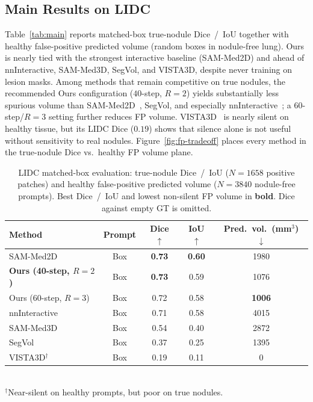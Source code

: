 \documentclass[letterpaper]{article} %
\begin{document}
\subsection{Main Results on LIDC}
\label{sec:exp:lidc}
Table~\ref{tab:main} reports matched-box true-nodule Dice~/~IoU together with healthy false-positive predicted volume (random boxes in nodule-free lung).
Ours is nearly tied with the strongest interactive baseline
(SAM-Med2D) and ahead of nnInteractive, SAM-Med3D, SegVol, and VISTA3D, despite
never training on lesion masks.
Among methods that remain competitive on true nodules, the recommended
Ours configuration (\(40\)-step, \(R{=}2\)) yields substantially less
spurious volume than SAM-Med2D~\citep{sam_med2d2023}, SegVol, and especially
nnInteractive~\citep{nninteractive2025}; a \(60\)-step/\(R{=}3\) setting
further reduces FP volume.
VISTA3D~\citep{vista3d2024} is nearly silent on healthy tissue, but its
LIDC Dice (\(0.19\)) shows that silence alone is not useful without
sensitivity to real nodules.
Figure~\ref{fig:fp-tradeoff} places every method in the true-nodule Dice
vs.\ healthy FP volume plane.

\begin{table}[t]
\centering
\caption{LIDC matched-box evaluation: true-nodule Dice~/~IoU
(\(N{=}1658\) positive patches) and healthy false-positive predicted
volume (\(N{=}3840\) nodule-free prompts). Best Dice~/~IoU and lowest
non-silent FP volume in \textbf{bold}. Dice against empty GT is omitted.}
\label{tab:main}
\label{tab:healthy_fp}
\begin{tabular}{lcccc}
\toprule
Method & Prompt & Dice \(\uparrow\) & IoU \(\uparrow\) &
Pred.\ vol.\ (mm\(^3\)) \(\downarrow\) \\
\midrule
SAM-Med2D
  & Box & \textbf{0.73} & \textbf{0.60} & 1980 \\
\textbf{Ours (40-step, \(R{=}2\))}
  & Box & \textbf{0.73} & 0.59 & 1076 \\
Ours (60-step, \(R{=}3\))
  & Box & 0.72 & 0.58 & \textbf{1006} \\
nnInteractive
  & Box & 0.71 & 0.58 & 4015 \\
SAM-Med3D
  & Box & 0.54 & 0.40 & 2872 \\
SegVol
  & Box & 0.37 & 0.25 & 1395 \\
VISTA3D$^\dagger$
  & Box & 0.19 & 0.11 & \(0\) \\
\bottomrule
\end{tabular}\\[0.25em]
{\footnotesize $^\dagger$Near-silent on healthy prompts, but poor on
true nodules.}
\end{table}
\end{document}
